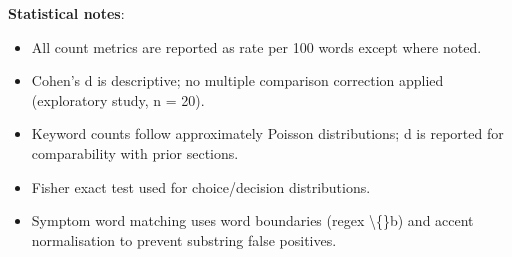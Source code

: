 \documentclass[11pt,a4paper]{article}
\begin{document}
\textbf{Statistical notes}:

\begin{itemize}[leftmargin=*]
  \item All count metrics are reported as rate per 100 words except where noted.
  \item Cohen's d is descriptive; no multiple comparison correction applied (exploratory study, n = 20).
  \item Keyword counts follow approximately Poisson distributions; d is reported for comparability with prior sections.
  \item Fisher exact test used for choice/decision distributions.
  \item Symptom word matching uses word boundaries (regex \textbackslash\{\}b) and accent normalisation to prevent substring false positives.
\end{itemize}
\end{document}
